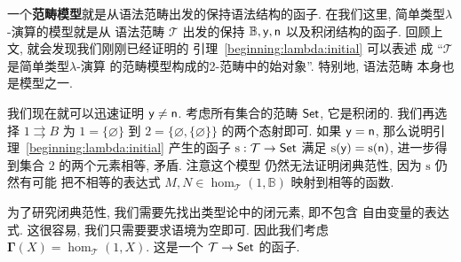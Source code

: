 一个\textbf{范畴模型}就是从语法范畴出发的保持语法结构的函子.
在我们这里, 简单类型\(\lambda\)-演算的模型就是从
语法范畴 \(\mathcal T\) 出发的保持
\(\mathbb B,\textnormal{\textsf{y}},\textnormal{\textsf{n}}\)
以及积闭结构的函子. 回顾上文, 就会发现我们刚刚已经证明的
引理~\ref{beginning:lambda:initial} 可以表述
成 “\(\mathcal T\) 是简单类型\(\lambda\)-演算
的范畴模型构成的2-范畴中的始对象”. 特别地, 语法范畴
本身也是模型之一.

我们现在就可以迅速证明 \(\textnormal{\textsf{y}}\ne\textnormal{\textsf{n}}\).
考虑所有集合的范畴 \(\textnormal{\textsf{Set}}\), 它是积闭的.
我们再选择 \(1 \rightrightarrows B\) 为
\(1=\{\varnothing\}\) 到
\(2=\{\varnothing, \{\varnothing\}\}\) 的两个态射即可.
如果 \(\textnormal{\textsf{y}}=\textnormal{\textsf{n}}\),
那么说明引理~\ref{beginning:lambda:initial} 产生的函子
\(\mathrm s:\mathcal T \to \textnormal{\textsf{Set}}\)
满足 \(\mathrm{s}(\textnormal{\textsf{y}}) = \mathrm{s}(\textnormal{\textsf{n}})\),
进一步得到集合 \(2\) 的两个元素相等, 矛盾. 注意这个模型
仍然无法证明闭典范性, 因为 \(\mathrm{s}\) 仍然有可能
把不相等的表达式 \(M,N \in
\hom_{\mathcal T}(1, \mathbb B)\)
映射到相等的函数.

为了研究闭典范性, 我们需要先找出类型论中的闭元素, 即不包含
自由变量的表达式. 这很容易, 我们只需要要求语境为空即可.
因此我们考虑 \(\boldsymbol\Gamma(X) = \hom_{\mathcal T}(1, X)\).
这是一个 \(\mathcal T \to \textnormal{\textsf{Set}}\) 的函子.

